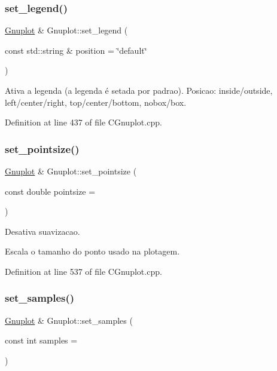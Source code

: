 \subsubsection{\texorpdfstring{set\+\_\+legend()}{set\_legend()}}
{\footnotesize\ttfamily \hyperlink{class_gnuplot}{Gnuplot} \& Gnuplot\+::set\+\_\+legend (\begin{DoxyParamCaption}\item[{const std\+::string \&}]{position = {\ttfamily \char`\"{}default\char`\"{}} }\end{DoxyParamCaption})}



Ativa a legenda (a legenda é setada por padrao). Posicao\+: inside/outside, left/center/right, top/center/bottom, nobox/box. 



Definition at line 437 of file C\+Gnuplot.\+cpp.

\mbox{\label{class_gnuplot_a95ec1636a871447dfe99463b769339c7}} 
\subsubsection{\texorpdfstring{set\+\_\+pointsize()}{set\_pointsize()}}
{\footnotesize\ttfamily \hyperlink{class_gnuplot}{Gnuplot} \& Gnuplot\+::set\+\_\+pointsize (\begin{DoxyParamCaption}\item[{const double}]{pointsize = {} }\end{DoxyParamCaption})}



Desativa suavizacao. 

Escala o tamanho do ponto usado na plotagem. 

Definition at line 537 of file C\+Gnuplot.\+cpp.

\mbox{\label{class_gnuplot_a671cbe7b18a267ea59f532c83a0035f6}} 
\subsubsection{\texorpdfstring{set\+\_\+samples()}{set\_samples()}}
{\footnotesize\ttfamily \hyperlink{class_gnuplot}{Gnuplot} \& Gnuplot\+::set\+\_\+samples (\begin{DoxyParamCaption}\item[{const int}]{samples = {} }\end{DoxyParamCaption})}



